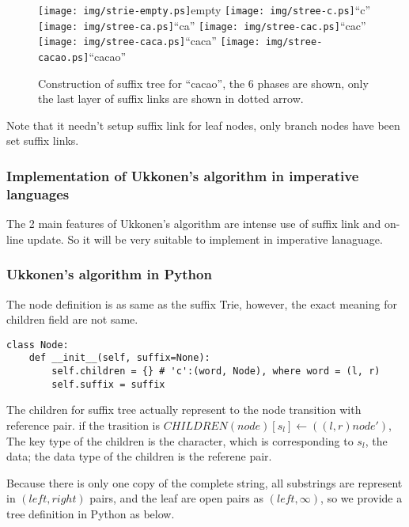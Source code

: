 \documentclass{article}
\begin{document}
\begin{figure}[htbp]
   \begin{center}
     \texttt{[image: img/strie-empty.ps]}empty
     \texttt{[image: img/stree-c.ps]}``c''
     \texttt{[image: img/stree-ca.ps]}``ca''
     \texttt{[image: img/stree-cac.ps]}``cac'' \newline
     \texttt{[image: img/stree-caca.ps]}``caca''
     \texttt{[image: img/stree-cacao.ps]}``cacao''
     \caption{Construction of suffix tree for ``cacao'', the 6 phases are shown, only the last layer of suffix links are shown in dotted arrow.}
     \label{fig:cons-stree-cacao}
   \end{center}
\end{figure}

Note that it needn't setup suffix link for leaf nodes, only branch nodes
have been set suffix links.

\subsubsection{Implementation of Ukkonen's algorithm in imperative languages}
The 2 main features of Ukkonen's algorithm are intense use of suffix link and
on-line update. So it will be very suitable to implement in imperative lanaguage.

\subsubsection*{Ukkonen's algorithm in Python}
The node definition is as same as the suffix Trie, however, the exact meaning
for children field are not same.

\lstset{language=Python}
\begin{lstlisting}
class Node:
    def __init__(self, suffix=None):
        self.children = {} # 'c':(word, Node), where word = (l, r)
        self.suffix = suffix
\end{lstlisting}

The children for suffix tree actually represent to the node transition
with reference pair. if the trasition is 
$CHILDREN(node)[s_l] \leftarrow ((l, r) node')$, 
The key type of the children is the character, which is corresponding 
to $s_l$, the data; the data type of the children is the referene pair.

Because there is only one copy of the complete string, all substrings
are represent in $(left, right)$ pairs, and the leaf are open pairs
as $(left, \infty)$, so we provide a tree definition in Python as below.
\end{document}
